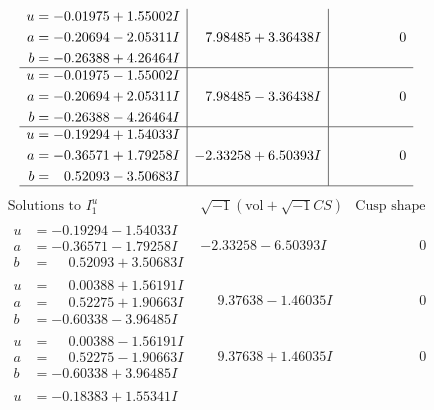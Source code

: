 \documentclass[1p]{elsarticle_modified}
\theoremstyle{definition}
\newcommand{\I}{\sqrt{-1}}
\begin{document}
$$\begin{array}{c|c|c}
\begin{aligned}
u &= -0.01975 + 1.55002 I \\
a &= -0.20694 - 2.05311 I \\
b &= -0.26388 + 4.26464 I\end{aligned}
 & \phantom{-}7.98485 + 3.36438 I & \phantom{-0.000000 } 0 \\ \hline\begin{aligned}
u &= -0.01975 - 1.55002 I \\
a &= -0.20694 + 2.05311 I \\
b &= -0.26388 - 4.26464 I\end{aligned}
 & \phantom{-}7.98485 - 3.36438 I & \phantom{-0.000000 } 0 \\ \hline\begin{aligned}
u &= -0.19294 + 1.54033 I \\
a &= -0.36571 + 1.79258 I \\
b &= \phantom{-}0.52093 - 3.50683 I\end{aligned}
 & -2.33258 + 6.50393 I & \phantom{-0.000000 } 0\\
 \hline 
 \end{array}$$\newpage$$\begin{array}{c|c|c}  
\text{Solutions to }I^u_{1}& \I (\text{vol} + \sqrt{-1}CS) & \text{Cusp shape}\\
 \hline 
\begin{aligned}
u &= -0.19294 - 1.54033 I \\
a &= -0.36571 - 1.79258 I \\
b &= \phantom{-}0.52093 + 3.50683 I\end{aligned}
 & -2.33258 - 6.50393 I & \phantom{-0.000000 } 0 \\ \hline\begin{aligned}
u &= \phantom{-}0.00388 + 1.56191 I \\
a &= \phantom{-}0.52275 + 1.90663 I \\
b &= -0.60338 - 3.96485 I\end{aligned}
 & \phantom{-}9.37638 - 1.46035 I & \phantom{-0.000000 } 0 \\ \hline\begin{aligned}
u &= \phantom{-}0.00388 - 1.56191 I \\
a &= \phantom{-}0.52275 - 1.90663 I \\
b &= -0.60338 + 3.96485 I\end{aligned}
 & \phantom{-}9.37638 + 1.46035 I & \phantom{-0.000000 } 0 \\ \hline\begin{aligned}
u &= -0.18383 + 1.55341 I \\

\end{aligned}
\end{array}$$
\end{document}
